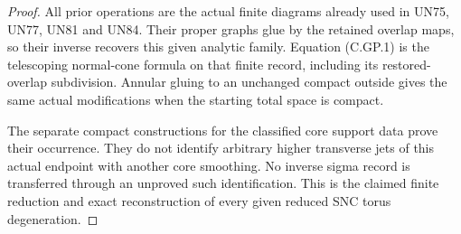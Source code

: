 \begin{proof}
All prior operations are the actual
finite diagrams already used in UN75,
UN77, UN81 and UN84. Their proper graphs
glue by the retained overlap maps, so
their inverse recovers this given
analytic family. Equation (C.GP.1)
is the telescoping normal-cone formula
on that finite record, including its
restored-overlap subdivision. Annular
gluing to an unchanged compact outside
gives the same actual modifications
when the starting total space is compact.

The separate compact constructions for
the classified core support data prove
their occurrence. They do not identify
arbitrary higher transverse jets of
this actual endpoint with another core
smoothing. No inverse sigma record is
transferred through an unproved such
identification. This is the claimed
finite reduction and exact reconstruction
of every given reduced SNC torus
degeneration.
\end{proof}
